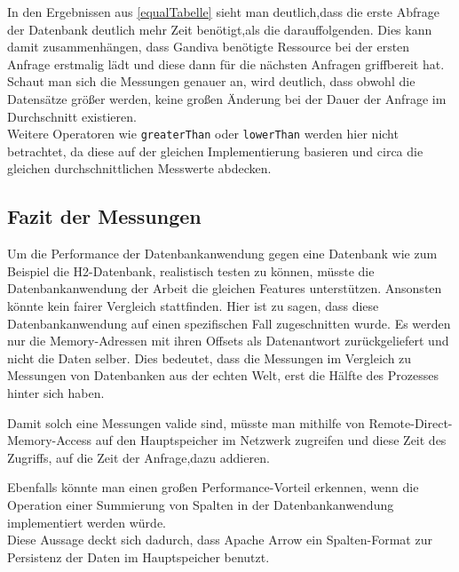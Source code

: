In den Ergebnissen aus \ref{equalTabelle} sieht man deutlich,dass die erste Abfrage der Datenbank deutlich mehr Zeit benötigt,als die darauffolgenden. Dies kann damit zusammenhängen, dass Gandiva benötigte Ressource bei der ersten Anfrage erstmalig lädt und diese dann für die nächsten Anfragen griffbereit hat.
Schaut man sich die Messungen genauer an, wird deutlich, dass obwohl die Datensätze größer werden, keine großen Änderung bei der Dauer der Anfrage im Durchschnitt existieren.\\
Weitere Operatoren wie \texttt{greaterThan} oder \texttt{lowerThan} werden hier nicht betrachtet, da diese auf der gleichen Implementierung basieren und circa die gleichen durchschnittlichen Messwerte abdecken.

\subsection{Fazit der Messungen}

Um die Performance der Datenbankanwendung gegen eine Datenbank wie zum Beispiel die H2-Datenbank, realistisch testen zu können, müsste die Datenbankanwendung der Arbeit die gleichen Features unterstützen. Ansonsten könnte kein fairer Vergleich stattfinden. Hier ist zu sagen, dass diese Datenbankanwendung auf einen spezifischen Fall zugeschnitten wurde. Es werden nur die Memory-Adressen mit ihren Offsets als Datenantwort zurückgeliefert und nicht die Daten selber. 
Dies bedeutet, dass die Messungen im Vergleich zu Messungen von Datenbanken aus der echten Welt, erst die Hälfte des Prozesses hinter sich haben. 

Damit solch eine Messungen valide sind, müsste man mithilfe von Remote-Direct-Memory-Access auf den Hauptspeicher im Netzwerk zugreifen und diese Zeit des Zugriffs, auf die Zeit der Anfrage,dazu addieren.

Ebenfalls könnte man einen großen Performance-Vorteil erkennen, wenn die Operation einer Summierung von Spalten in der Datenbankanwendung implementiert werden würde.\\
Diese Aussage deckt sich dadurch, dass Apache Arrow ein Spalten-Format zur Persistenz der Daten im Hauptspeicher benutzt.



